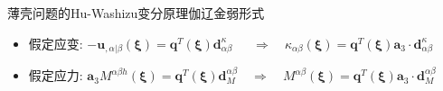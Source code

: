 \begin{frame}{薄壳问题的Hu-Washizu变分原理伽辽金弱形式}
    \begin{itemize}
    \item 假定应变:
        $\displaystyle 
        -\boldsymbol u_{,\alpha\vert\beta}(\boldsymbol \xi) = \boldsymbol q^T(\boldsymbol \xi) \boldsymbol d_{\alpha\beta}^\kappa 
        \quad \;\; \Rightarrow \quad
        \kappa_{\alpha\beta}(\boldsymbol \xi) = \boldsymbol q^T(\boldsymbol \xi) \boldsymbol a_3 \cdot \boldsymbol d_{\alpha\beta}^\kappa$
    \item 假定应力:
        $\displaystyle 
        \boldsymbol a_3 M^{\alpha\beta h}(\boldsymbol \xi) = \boldsymbol q^T(\boldsymbol \xi) \boldsymbol d^{\alpha\beta}_M
        \quad\Rightarrow \quad
        M^{\alpha\beta}(\boldsymbol \xi) = \boldsymbol q^T(\boldsymbol \xi) \boldsymbol a_3 \cdot \boldsymbol d^{\alpha\beta}_M$
    \end{itemize}
\end{frame}



